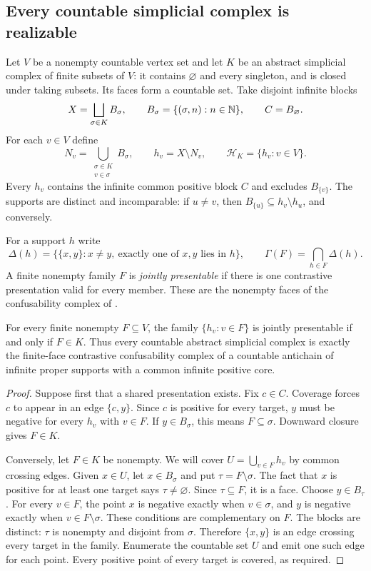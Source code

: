 \subsection{Every countable simplicial complex is realizable}
Let $V$ be a nonempty countable vertex set and let $K$ be an abstract simplicial complex of finite subsets of $V$: it contains $\varnothing$ and every singleton, and is closed under taking subsets. Its faces form a countable set. Take disjoint infinite blocks
\[
X=\bigsqcup_{\sigma\in K}B_\sigma,
\qquad B_\sigma=\{(\sigma,n):n\in\mathbb N\},
\qquad C=B_\varnothing.
\]
For each $v\in V$ define
\[
N_v=\bigcup_{\substack{\sigma\in K\\v\in\sigma}}B_\sigma,
\qquad h_v=X\setminus N_v,
\qquad \mathcal H_K=\{h_v:v\in V\}.
\]
Every $h_v$ contains the infinite common positive block $C$ and excludes $B_{\{v\}}$. The supports are distinct and incomparable: if $u\ne v$, then $B_{\{u\}}\subseteq h_v\setminus h_u$, and conversely.

For a support $h$ write
\[
\Delta(h)=\{\{x,y\}:x\ne y,\ \text{exactly one of }x,y\text{ lies in }h\},
\qquad
\Gamma(F)=\bigcap_{h\in F}\Delta(h).
\]
A finite nonempty family $F$ is \emph{jointly presentable} if there is one contrastive presentation valid for every member. These are the nonempty faces of the confusability complex of \citet{P28}.

\begin{theorem}\label{thm:ca:realization}
For every finite nonempty $F\subseteq V$, the family $\{h_v:v\in F\}$ is jointly presentable if and only if $F\in K$. Thus every countable abstract simplicial complex is exactly the finite-face contrastive confusability complex of a countable antichain of infinite proper supports with a common infinite positive core.
\end{theorem}
\begin{proof}
Suppose first that a shared presentation exists. Fix $c\in C$. Coverage forces $c$ to appear in an edge $\{c,y\}$. Since $c$ is positive for every target, $y$ must be negative for every $h_v$ with $v\in F$. If $y\in B_\sigma$, this means $F\subseteq\sigma$. Downward closure gives $F\in K$.

Conversely, let $F\in K$ be nonempty. We will cover $U=\bigcup_{v\in F}h_v$ by common crossing edges. Given $x\in U$, let $x\in B_\sigma$ and put $\tau=F\setminus\sigma$. The fact that $x$ is positive for at least one target says $\tau\ne\varnothing$. Since $\tau\subseteq F$, it is a face. Choose $y\in B_\tau$. For every $v\in F$, the point $x$ is negative exactly when $v\in\sigma$, and $y$ is negative exactly when $v\in F\setminus\sigma$. These conditions are complementary on $F$. The blocks are distinct: $\tau$ is nonempty and disjoint from $\sigma$. Therefore $\{x,y\}$ is an edge crossing every target in the family. Enumerate the countable set $U$ and emit one such edge for each point. Every positive point of every target is covered, as required.
\end{proof}

